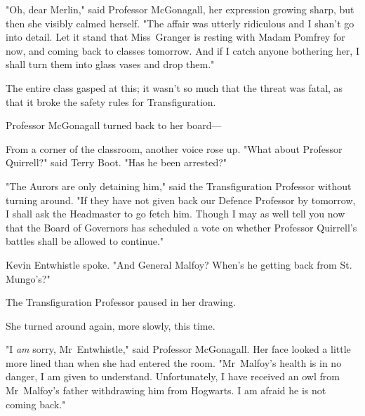 "Oh, dear Merlin," said Professor McGonagall, her expression growing sharp, but
then she visibly calmed herself. "The affair was utterly ridiculous and I
shan’t go into detail. Let it stand that Miss~Granger is resting with Madam
Pomfrey for now, and coming back to classes tomorrow. And if I catch anyone
bothering her, I shall turn them into glass vases and drop them."

The entire class gasped at this; it wasn’t so much that the threat was fatal,
as that it broke the safety rules for Transfiguration.

Professor McGonagall turned back to her board—

From a corner of the classroom, another voice rose up. "What about Professor
Quirrell?" said Terry Boot. "Has he been arrested?"

"The Aurors are only detaining him," said the Transfiguration Professor without
turning around. "If they have not given back our Defence Professor by tomorrow,
I shall ask the Headmaster to go fetch him. Though I may as well tell you now
that the Board of Governors has scheduled a vote on whether Professor
Quirrell’s battles shall be allowed to continue."

Kevin Entwhistle spoke. "And General Malfoy? When’s he getting back from St.
Mungo’s?"

The Transfiguration Professor paused in her drawing.

She turned around again, more slowly, this time.

"I \emph{am} sorry, Mr~Entwhistle," said Professor McGonagall. Her face looked
a little more lined than when she had entered the room. "Mr~Malfoy’s health is
in no danger, I am given to understand. Unfortunately, I have received an owl
from Mr~Malfoy’s father withdrawing him from Hogwarts. I am afraid he is not
coming back."
